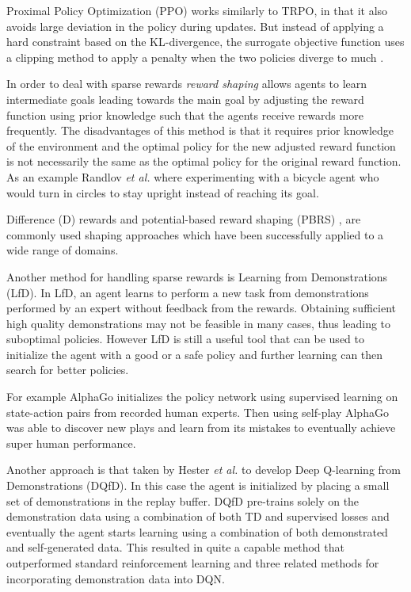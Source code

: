 Proximal Policy Optimization (PPO) works similarly to TRPO, in that it also avoids large deviation in the policy during updates. But instead of applying a hard constraint based on the KL-divergence, the surrogate objective function uses a clipping method to apply a penalty when the two policies diverge to much \cite{schulman2017proximal}.

In order to deal with sparse rewards \emph{reward shaping} allows agents to learn intermediate goals leading towards the main goal by adjusting the reward function using prior knowledge such that the agents receive rewards more frequently\cite{wiewiora2010reward}. The disadvantages of this method is that it requires prior knowledge of the environment and the optimal policy for the new adjusted reward function is not necessarily the same as the optimal policy for the original reward function. As an example Randlov \emph{et al.} \cite{randlov1998learning} where experimenting with a bicycle agent who would turn in circles to stay upright instead of reaching its goal.

Difference (D) \cite{wolpert2000collective} rewards and potential-based reward shaping (PBRS) \cite{ng1999policy}, are commonly used shaping approaches which have been successfully applied to a wide range of domains. 

Another method for handling sparse rewards is Learning from Demonstrations (LfD). In LfD, an agent learns to perform a new task from demonstrations performed by an expert without feedback from the rewards. Obtaining sufficient high quality demonstrations may not be feasible in many cases, thus leading to suboptimal policies. However LfD is still a useful tool that can be used to initialize the agent with a good or a safe policy and further learning can then search for better policies. 

For example AlphaGo \cite{silver2016mastering} initializes the policy network using supervised learning on state-action pairs from recorded human experts. Then using self-play AlphaGo was able to discover new plays and learn from its mistakes to eventually achieve super human performance.

Another approach is that taken by Hester \emph{et al.} \cite{hester2018deep} to develop Deep Q-learning from Demonstrations (DQfD). In this case the agent is initialized by placing a small set of demonstrations in the replay buffer. DQfD pre-trains solely on the demonstration data using a combination of both TD and supervised losses and eventually the agent starts learning using a combination of both demonstrated and self-generated data. This resulted in quite a capable method that outperformed standard reinforcement learning and three related methods for incorporating demonstration data into DQN.

